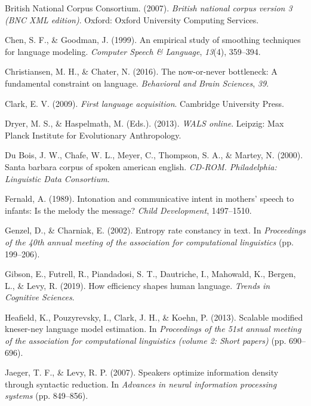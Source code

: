 \documentclass[10pt, letterpaper]{article}
\begin{document}
\leavevmode\hypertarget{ref-british-national-corpus-consortium2007}{}%
British National Corpus Consortium. (2007). \emph{British national
corpus version 3 (BNC XML edition)}. Oxford: Oxford University Computing
Services.

\leavevmode\hypertarget{ref-chen1999}{}%
Chen, S. F., \& Goodman, J. (1999). An empirical study of smoothing
techniques for language modeling. \emph{Computer Speech \& Language},
\emph{13}(4), 359--394.

\leavevmode\hypertarget{ref-christiansen2016}{}%
Christiansen, M. H., \& Chater, N. (2016). The now-or-never bottleneck:
A fundamental constraint on language. \emph{Behavioral and Brain
Sciences}, \emph{39}.

\leavevmode\hypertarget{ref-clark2009}{}%
Clark, E. V. (2009). \emph{First language acquisition}. Cambridge
University Press.

\leavevmode\hypertarget{ref-2013}{}%
Dryer, M. S., \& Haspelmath, M. (Eds.). (2013). \emph{WALS online}.
Leipzig: Max Planck Institute for Evolutionary Anthropology.

\leavevmode\hypertarget{ref-sbc}{}%
Du Bois, J. W., Chafe, W. L., Meyer, C., Thompson, S. A., \& Martey, N.
(2000). Santa barbara corpus of spoken american english. \emph{CD-ROM.
Philadelphia: Linguistic Data Consortium}.

\leavevmode\hypertarget{ref-fernald1989}{}%
Fernald, A. (1989). Intonation and communicative intent in mothers'
speech to infants: Is the melody the message? \emph{Child Development},
1497--1510.

\leavevmode\hypertarget{ref-genzel2002}{}%
Genzel, D., \& Charniak, E. (2002). Entropy rate constancy in text. In
\emph{Proceedings of the 40th annual meeting of the association for
computational linguistics} (pp. 199--206).

\leavevmode\hypertarget{ref-gibson2019}{}%
Gibson, E., Futrell, R., Piandadosi, S. T., Dautriche, I., Mahowald, K.,
Bergen, L., \& Levy, R. (2019). How efficiency shapes human language.
\emph{Trends in Cognitive Sciences}.

\leavevmode\hypertarget{ref-heafield2013}{}%
Heafield, K., Pouzyrevsky, I., Clark, J. H., \& Koehn, P. (2013).
Scalable modified kneser-ney language model estimation. In
\emph{Proceedings of the 51st annual meeting of the association for
computational linguistics (volume 2: Short papers)} (pp. 690--696).

\leavevmode\hypertarget{ref-jaeger2007}{}%
Jaeger, T. F., \& Levy, R. P. (2007). Speakers optimize information
density through syntactic reduction. In \emph{Advances in neural
information processing systems} (pp. 849--856).
\end{document}
